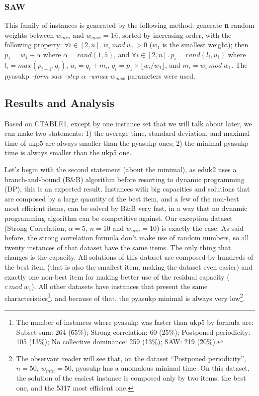 \documentclass[runningheads,a4paper]{llncs}
\begin{document}
\subsubsection{SAW}
This family of instances is generated by the following method: generate \textbf{n} random weights between \(w_{min}\) and \(w_{max} = 1\overline{n}\), sorted by increasing order, with the following property: \(\forall i \in [2, n].~w_i~mod~w_1 > 0\) (\(w_1\) is the smallest weight); then \(p_1 = w_1 + \alpha\) where \(\alpha = rand(1,5)\), and \(\forall i \in [2, n].~p_i = rand(l_i, u_i)\) where \(l_i = max(p_{i-1}, q_i)\), \(u_i = q_i + m_i\), \(q_i = p_1 \times \lfloor w_i / w_1 \rfloor \), and \(m_i = w_i~mod~w_1\). The pyasukp \emph{-form saw -step \(\alpha\) -wmax \(w_{max}\)} parameters were used.

\subsection{Results and Analysis}

Based on CTABLE1, except by one instance set that we will talk about later, we can make two statements: 1) the average time, standard deviation, and maximal time of ukp5 are always smaller than the pyasukp ones; 2) the minimal pyasukp time is always smaller than the ukp5 one.

Let's begin with the second statement (about the minimal), as eduk2 uses a branch-and-bound (B\&B) algorithm before resorting to dynamic programming (DP), this is an expected result. Instances with big capacities and solutions that are composed by a large quantity of the best item, and a few of the non-best most efficient items, can be solved by B\&B very fast, in a way that no dynamic programming algorithm can be competitive against. Our exception dataset (Strong Correlation, \(\alpha = 5\), \(n = 10\) and \(w_{min} = 10\)) is exactly the case. As said before, the strong correlation formula don't make use of random numbers, so all twenty instances of that dataset have the same items. The only thing that changes is the capacity. All solutions of this dataset are composed by hundreds of the best item (that is also the smallest item, making the dataset even easier) and exactly one non-best item for making better use of the residual capacity (\(c~mod~w_1\)). All other datasets have instances that present the same characteristics\footnote{The number of instances where pyasukp was faster than ukp5 by formula are: Subset-sum: 264 (\~65\%); Strong correlation: 60 (25\%); Postponed periodicity: 105 (\~13\%); No collective dominance: 259 (\~13\%); SAW: 219 (\~20\%).}, and because of that, the pyasukp minimal is always very low\footnote{The observant reader will see that, on the dataset ``Postponed periodicity'', \(n = 50\), \(w_{min} = 50\), pyasukp has a anomalous minimal time. On this dataset, the solution of the easiest instance is composed only by two items, the best one, and the 5317 most efficient one.}.
\end{document}
